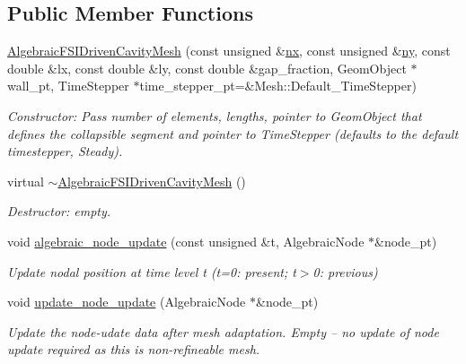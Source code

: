 \subsection*{Public Member Functions}
\begin{DoxyCompactItemize}
\item 
\hyperlink{classoomph_1_1AlgebraicFSIDrivenCavityMesh_a973ccadc769d98fed6bc9dd4eff32083}{Algebraic\+F\+S\+I\+Driven\+Cavity\+Mesh} (const unsigned \&\hyperlink{classoomph_1_1SimpleRectangularQuadMesh_a4ff7678ec433180e2245ea2147f222b7}{nx}, const unsigned \&\hyperlink{classoomph_1_1SimpleRectangularQuadMesh_a45011f22dedd480392b1f376e4269921}{ny}, const double \&lx, const double \&ly, const double \&gap\+\_\+fraction, Geom\+Object $\ast$wall\+\_\+pt, Time\+Stepper $\ast$time\+\_\+stepper\+\_\+pt=\&Mesh\+::\+Default\+\_\+\+Time\+Stepper)
\begin{DoxyCompactList}\small\item\em Constructor\+: Pass number of elements, lengths, pointer to Geom\+Object that defines the collapsible segment and pointer to Time\+Stepper (defaults to the default timestepper, Steady). \end{DoxyCompactList}\item 
virtual \hyperlink{classoomph_1_1AlgebraicFSIDrivenCavityMesh_a048a142aff0ca5fd62273f756bce4ab6}{$\sim$\+Algebraic\+F\+S\+I\+Driven\+Cavity\+Mesh} ()
\begin{DoxyCompactList}\small\item\em Destructor\+: empty. \end{DoxyCompactList}\item 
void \hyperlink{classoomph_1_1AlgebraicFSIDrivenCavityMesh_a56c72b78935e84f7fef3f6b5d85556c3}{algebraic\+\_\+node\+\_\+update} (const unsigned \&t, Algebraic\+Node $\ast$\&node\+\_\+pt)
\begin{DoxyCompactList}\small\item\em Update nodal position at time level t (t=0\+: present; t$>$0\+: previous) \end{DoxyCompactList}\item 
void \hyperlink{classoomph_1_1AlgebraicFSIDrivenCavityMesh_a87d34d6cf84c62a9049773451c664176}{update\+\_\+node\+\_\+update} (Algebraic\+Node $\ast$\&node\+\_\+pt)
\begin{DoxyCompactList}\small\item\em Update the node-\/udate data after mesh adaptation. Empty -- no update of node update required as this is non-\/refineable mesh. \end{DoxyCompactList}\end{DoxyCompactItemize}
